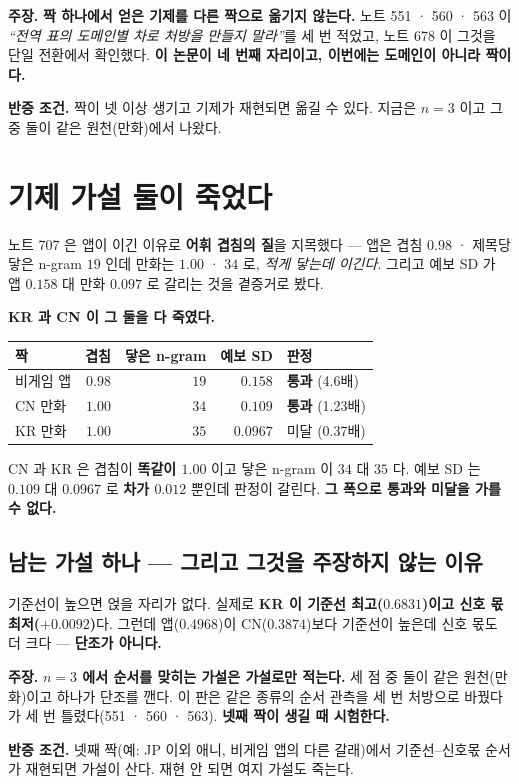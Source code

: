 \documentclass[10pt,a4paper]{article}
\newcommand{\claim}[2]{\begin{claimbox}\textbf{주장.} #1\par\smallskip
  \textcolor{gray!70}{\textbf{반증 조건.} #2}\end{claimbox}}
\begin{document}
\claim{\textbf{짝 하나에서 얻은 기제를 다른 짝으로 옮기지 않는다.} 노트 551 · 560 ·
563 이 \emph{``전역 표의 도메인별 차로 처방을 만들지 말라''}를 세 번 적었고, 노트 678 이
그것을 단일 전환에서 확인했다. \textbf{이 논문이 네 번째 자리이고, 이번에는 도메인이
아니라 짝이다.}}
{짝이 넷 이상 생기고 기제가 재현되면 옮길 수 있다. 지금은 $n=3$ 이고 그중 둘이 같은
원천(만화)에서 나왔다.}

\section{기제 가설 둘이 죽었다}

노트 707 은 앱이 이긴 이유로 \textbf{어휘 겹침의 질}을 지목했다 --- 앱은 겹침
$0.98$ · 제목당 닿은 n-gram $19$ 인데 만화는 $1.00$ · $34$ 로, \emph{적게 닿는데
이긴다}. 그리고 예보 SD 가 앱 $0.158$ 대 만화 $0.097$ 로 갈리는 것을 곁증거로 봤다.

\textbf{KR 과 CN 이 그 둘을 다 죽였다.}

\begin{center}
\begin{tabular}{lrrrl}
\toprule
짝 & 겹침 & 닿은 n-gram & 예보 SD & 판정 \\
\midrule
비게임 앱 & $0.98$ & $19$ & $0.158$ & \textbf{통과} (4.6배) \\
CN 만화 & $1.00$ & $34$ & $0.109$ & \textbf{통과} (1.23배) \\
KR 만화 & $1.00$ & $35$ & $0.0967$ & 미달 (0.37배) \\
\bottomrule
\end{tabular}
\end{center}

CN 과 KR 은 겹침이 \textbf{똑같이 $1.00$} 이고 닿은 n-gram 이 $34$ 대 $35$ 다. 예보
SD 는 $0.109$ 대 $0.0967$ 로 \textbf{차가 $0.012$} 뿐인데 판정이 갈린다.
\textbf{그 폭으로 통과와 미달을 가를 수 없다.}

\subsection*{남는 가설 하나 --- 그리고 그것을 주장하지 않는 이유}

기준선이 높으면 얹을 자리가 없다. 실제로 \textbf{KR 이 기준선 최고($0.6831$)이고 신호
몫 최저($+0.0092$)}다. 그런데 앱($0.4968$)이 CN($0.3874$)보다 기준선이 높은데 신호 몫도
더 크다 --- \textbf{단조가 아니다.}

\claim{\textbf{$n=3$ 에서 순서를 맞히는 가설은 가설로만 적는다.} 세 점 중 둘이 같은
원천(만화)이고 하나가 단조를 깬다. 이 판은 같은 종류의 순서 관측을 세 번 처방으로
바꿨다가 세 번 틀렸다(551 · 560 · 563). \textbf{넷째 짝이 생길 때 시험한다.}}
{넷째 짝(예: JP 이외 애니, 비게임 앱의 다른 갈래)에서 기준선--신호몫 순서가 재현되면
가설이 산다. 재현 안 되면 여지 가설도 죽는다.}
\end{document}

